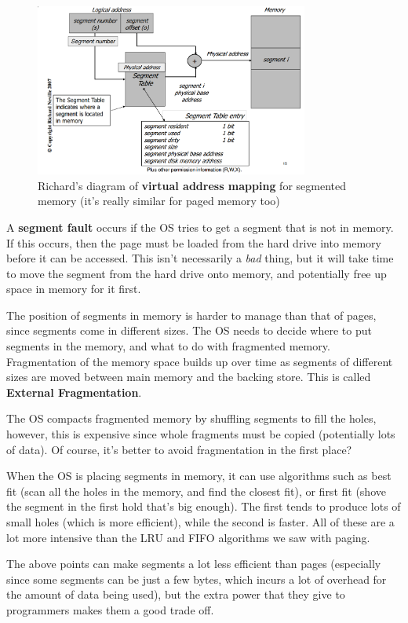 \begin{figure}[H]
  \centering
  \includegraphics[width=90mm]{images/memoryMapping.png}
  \caption{Richard's diagram of \textbf{virtual address mapping} for segmented
  memory (it's really similar for paged memory too)}
  \label{memoryMap}
\end{figure}

A \textbf{segment fault} occurs if the OS tries to get a segment that is not in
memory. If this occurs, then the page must be loaded from the hard drive into
memory before it can be accessed. This isn't necessarily a \textit{bad} thing,
but it will take time to move the segment from the hard drive onto memory, and
potentially free up space in memory for it first.

The position of segments in memory is harder to manage than that of pages, since
segments come in different sizes. The OS needs to decide where to put segments
in the memory, and what to do with fragmented memory. Fragmentation of the
memory space builds up over time as segments of different sizes are moved
between main memory and the backing store. This is called \textbf{External
Fragmentation}.

The OS compacts fragmented memory by shuffling segments to fill the holes,
however, this is expensive since whole fragments must be copied (potentially
lots of data). Of course, it's better to avoid fragmentation in the first place?

When the OS is placing segments in memory, it can use algorithms such as best
fit (scan all the holes in the memory, and find the closest fit), or first fit
(shove the segment in the first hold that's big enough). The first tends to
produce lots of small holes (which is more efficient), while the second is
faster. All of these are a lot more intensive than the LRU and FIFO algorithms
we saw with paging.

The above points can make segments a lot less efficient than pages (especially
since some segments can be just a few bytes, which incurs a lot of overhead for
the amount of data being used), but the extra power that they give to
programmers makes them a good trade off.
